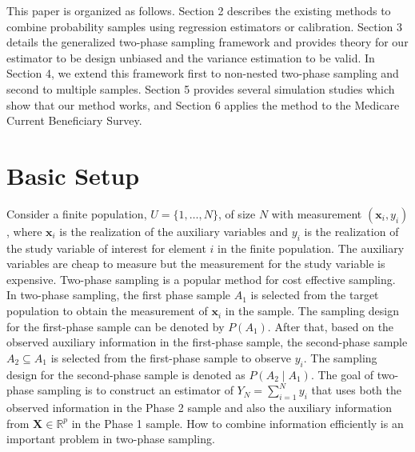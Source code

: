 \documentclass[12pt]{article}
\newcommand{\bx}{\mathbf{x}}
\newcommand{\R}{\mathbb{R}}
\renewcommand{\bf}[1]{\mathbf{#1}}
\begin{document}
This paper is organized as follows. 
Section 2 describes the existing methods to combine probability samples using
regression estimators or calibration.
Section 3 details the generalized
two-phase sampling framework and provides theory for our estimator to be design
unbiased and the variance estimation to be valid. In Section 4, we extend this
framework first to non-nested two-phase sampling and second to multiple
samples. Section 5 provides several simulation studies which show that our
method works, and Section 6 applies the method to the Medicare Current
Beneficiary Survey. 

\newpage 

\section{Basic Setup}

Consider a finite population, $U = \{1, \dots, N\}$, of size $N$ 
with measurement  $(\bx_i, y_i)$, where $\bx_i$ is the realization of the
auxiliary variables and $y_i$ is the realization of the study variable of
interest for element  $i$ in the finite population. The auxiliary variables are
cheap to measure but the measurement for the study variable is expensive.
Two-phase sampling is a popular method for cost effective sampling.
In two-phase sampling, the first phase sample $A_1$  is selected from the
target population to obtain the measurement of $\bx_i$ in the sample. The
sampling design for the first-phase sample can be denoted by $P(A_1)$. After
that, based on the observed auxiliary information in the first-phase  sample,
the second-phase sample $A_2 \subseteq A_1$ is selected from the first-phase
sample to observe $y_i$. The sampling design for the second-phase sample is
denoted as $P( A_2 \mid A_1)$.  
The
goal of two-phase sampling is to construct an estimator of $Y_N =  \sum_{i=1}^N y_i$ 
that uses both the observed information in the Phase 2 sample and also the 
auxiliary information from $\bf X \in \R^p$ in the Phase 1 sample. How to
combine information efficiently is an important problem in two-phase sampling. 
\end{document}
